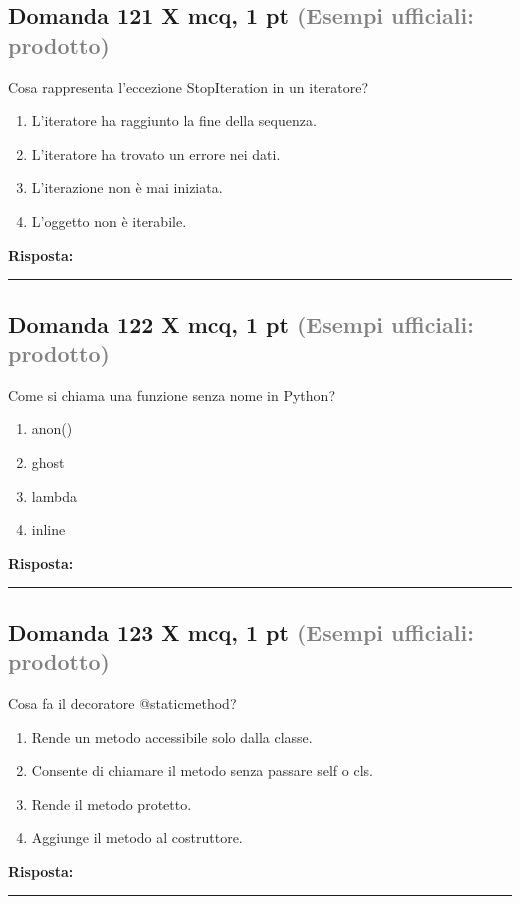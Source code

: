 \documentclass[a4paper,11pt]{article}
\begin{document}
\subsection*{Domanda 121 X \hfill {\small mcq, 1 pt \textcolor{gray}{(Esempi ufficiali: prodotto)}}}
Cosa rappresenta l'eccezione StopIteration in un iteratore?

\begin{enumerate}[label=\alph*)]
\item L'iteratore ha raggiunto la fine della sequenza.
\item L'iteratore ha trovato un errore nei dati.
\item L'iterazione non è mai iniziata.
\item L'oggetto non è iterabile.
\end{enumerate}
\vspace{0.2cm}
\noindent\textbf{Risposta:}\par
\vspace{1.5cm}\hrule


\subsection*{Domanda 122 X \hfill {\small mcq, 1 pt \textcolor{gray}{(Esempi ufficiali: prodotto)}}}
Come si chiama una funzione senza nome in Python?

\begin{enumerate}[label=\alph*)]
\item anon()
\item ghost
\item lambda
\item inline
\end{enumerate}
\vspace{0.2cm}
\noindent\textbf{Risposta:}\par
\vspace{1.5cm}\hrule


\subsection*{Domanda 123 X \hfill {\small mcq, 1 pt \textcolor{gray}{(Esempi ufficiali: prodotto)}}}
Cosa fa il decoratore @staticmethod?

\begin{enumerate}[label=\alph*)]
\item Rende un metodo accessibile solo dalla classe.
\item Consente di chiamare il metodo senza passare self o cls.
\item Rende il metodo protetto.
\item Aggiunge il metodo al costruttore.
\end{enumerate}
\vspace{0.2cm}
\noindent\textbf{Risposta:}\par
\vspace{1.5cm}\hrule
\end{document}
